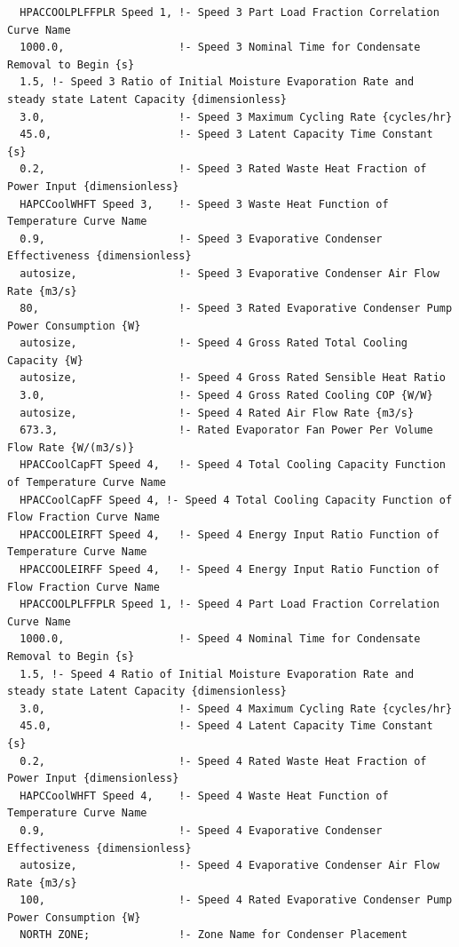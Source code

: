 \begin{lstlisting}
  HPACCOOLPLFFPLR Speed 1, !- Speed 3 Part Load Fraction Correlation Curve Name
  1000.0,                  !- Speed 3 Nominal Time for Condensate Removal to Begin {s}
  1.5, !- Speed 3 Ratio of Initial Moisture Evaporation Rate and steady state Latent Capacity {dimensionless}
  3.0,                     !- Speed 3 Maximum Cycling Rate {cycles/hr}
  45.0,                    !- Speed 3 Latent Capacity Time Constant {s}
  0.2,                     !- Speed 3 Rated Waste Heat Fraction of Power Input {dimensionless}
  HAPCCoolWHFT Speed 3,    !- Speed 3 Waste Heat Function of Temperature Curve Name
  0.9,                     !- Speed 3 Evaporative Condenser Effectiveness {dimensionless}
  autosize,                !- Speed 3 Evaporative Condenser Air Flow Rate {m3/s}
  80,                      !- Speed 3 Rated Evaporative Condenser Pump Power Consumption {W}
  autosize,                !- Speed 4 Gross Rated Total Cooling Capacity {W}
  autosize,                !- Speed 4 Gross Rated Sensible Heat Ratio
  3.0,                     !- Speed 4 Gross Rated Cooling COP {W/W}
  autosize,                !- Speed 4 Rated Air Flow Rate {m3/s}
  673.3,                   !- Rated Evaporator Fan Power Per Volume Flow Rate {W/(m3/s)}
  HPACCoolCapFT Speed 4,   !- Speed 4 Total Cooling Capacity Function of Temperature Curve Name
  HPACCoolCapFF Speed 4, !- Speed 4 Total Cooling Capacity Function of Flow Fraction Curve Name
  HPACCOOLEIRFT Speed 4,   !- Speed 4 Energy Input Ratio Function of Temperature Curve Name
  HPACCOOLEIRFF Speed 4,   !- Speed 4 Energy Input Ratio Function of Flow Fraction Curve Name
  HPACCOOLPLFFPLR Speed 1, !- Speed 4 Part Load Fraction Correlation Curve Name
  1000.0,                  !- Speed 4 Nominal Time for Condensate Removal to Begin {s}
  1.5, !- Speed 4 Ratio of Initial Moisture Evaporation Rate and steady state Latent Capacity {dimensionless}
  3.0,                     !- Speed 4 Maximum Cycling Rate {cycles/hr}
  45.0,                    !- Speed 4 Latent Capacity Time Constant {s}
  0.2,                     !- Speed 4 Rated Waste Heat Fraction of Power Input {dimensionless}
  HAPCCoolWHFT Speed 4,    !- Speed 4 Waste Heat Function of Temperature Curve Name
  0.9,                     !- Speed 4 Evaporative Condenser Effectiveness {dimensionless}
  autosize,                !- Speed 4 Evaporative Condenser Air Flow Rate {m3/s}
  100,                     !- Speed 4 Rated Evaporative Condenser Pump Power Consumption {W}
  NORTH ZONE;              !- Zone Name for Condenser Placement
\end{lstlisting}

